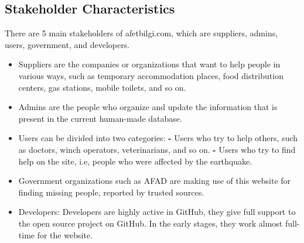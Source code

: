 \documentclass[listof=nochaptergap]{report}
\begin{document}
    \subsection{Stakeholder Characteristics}
    There are 5 main stakeholders of afetbilgi.com, which are suppliers, admins, users, government, and developers.
    \begin{itemize}
        \item Suppliers are the companies or organizations that want to help people in various ways, such as temporary accommodation places, food distribution centers, gas stations, mobile toilets, and so on.
        \item Admins are the people who organize and update the information that is present in the current human-made database.
        \item Users can be divided into two categories:
            \subitem \textbf{-} Users who try to help others, such as doctors, winch operators, veterinarians, and so on.
            \subitem \textbf{-} Users who try to find help on the site, i.e, people who were affected by the earthquake.
        \item Government organizations such as AFAD are making use of this website for finding missing people, reported by trusted sources.
        \item Developers: Developers are highly active in GitHub, they give full support to the open source project on GitHub. In the early stages, they work almost full-time for the website.
    \end{itemize}
\end{document}
